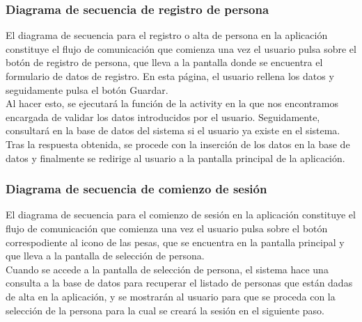 \subsubsection{Diagrama de secuencia de registro de persona}

El diagrama de secuencia para el registro o alta de persona en la aplicación constituye el flujo de comunicación que comienza una vez el usuario pulsa sobre el botón de registro de persona, que lleva a la pantalla donde se encuentra el formulario de datos de registro. En esta página, el usuario rellena los datos y seguidamente pulsa el botón Guardar.\\

Al hacer esto, se ejecutará la función de la activity en la que nos encontramos encargada de validar los datos introducidos por el usuario. Seguidamente, consultará en la base de datos del sistema si el usuario ya existe en el sistema.\\

Tras la respuesta obtenida, se procede con la inserción de los datos en la base de datos y finalmente se redirige al usuario a la pantalla principal de la aplicación.


\subsubsection{Diagrama de secuencia de comienzo de sesión}

El diagrama de secuencia para el comienzo de sesión en la aplicación constituye el flujo de comunicación que comienza una vez el usuario pulsa sobre el botón correspodiente al icono de las pesas, que se encuentra en la pantalla principal y que lleva a la pantalla de selección de persona.\\

Cuando se accede a la pantalla de selección de persona, el sistema hace una consulta a la base de datos para recuperar el listado de personas que están dadas de alta en la aplicación, y se mostrarán al usuario para que se proceda con la selección de la persona para la cual se creará la sesión en el siguiente paso.\\


